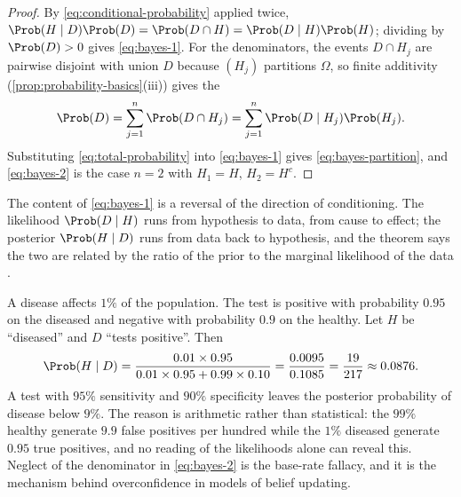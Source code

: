 \begin{proof}
	By \eqref{eq:conditional-probability} applied twice,
	$\Prob(H\mid D)\Prob(D)=\Prob(D\cap H)=\Prob(D\mid H)\Prob(H)$; dividing by
	$\Prob(D)>0$ gives \eqref{eq:bayes-1}. For the denominators, the events
	$D\cap H_j$ are pairwise disjoint with union $D$ because $(H_j)$ partitions
	$\Omega$, so finite additivity (\autoref{prop:probability-basics}(iii)) gives
	the 
	\begin{equation}\label{eq:total-probability}
		\Prob(D)=\sum_{j=1}^{n}\Prob(D\cap H_j)
		=\sum_{j=1}^{n}\Prob(D\mid H_j)\Prob(H_j) .
	\end{equation}
	Substituting \eqref{eq:total-probability} into \eqref{eq:bayes-1} gives
	\eqref{eq:bayes-partition}, and \eqref{eq:bayes-2} is the case
	$n=2$ with $H_1=H$, $H_2=H^{c}$.
\end{proof}

The content of \eqref{eq:bayes-1} is a reversal of the direction of conditioning.
The likelihood $\Prob(D\mid H)$ runs from hypothesis to data, from cause to
effect; the posterior $\Prob(H\mid D)$ runs from data back to hypothesis, and
the theorem says the two are related by the ratio of the prior to the marginal
likelihood of the data \autocite[slide 6]{fukuda2026probability}.

\begin{eg}\label{eg:medical-test}
	A disease affects $1\%$ of the population. The test is positive with probability
	$0.95$ on the diseased and negative with probability $0.9$ on the healthy. Let
	$H$ be ``diseased'' and $D$ ``tests positive''. Then
	\[
		\Prob(H\mid D)
		=\frac{0.01\times0.95}{0.01\times0.95+0.99\times0.10}
		=\frac{0.0095}{0.1085}=\frac{19}{217}\approx0.0876 .
	\]
	A test with $95\%$ sensitivity and $90\%$ specificity leaves the posterior
	probability of disease below $9\%$. The reason is arithmetic rather than
	statistical: the $99\%$ healthy generate $9.9$ false positives per hundred while
	the $1\%$ diseased generate $0.95$ true positives, and no reading of the
	likelihoods alone can reveal this. Neglect of the denominator in
	\eqref{eq:bayes-2} is the base-rate fallacy, and it is the mechanism behind
	overconfidence in models of belief updating.
\end{eg}

